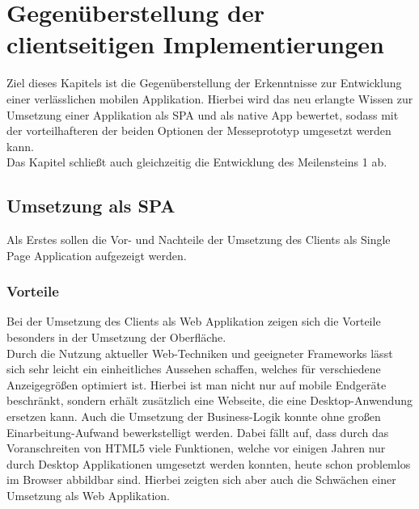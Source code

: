 \chapter{Gegenüberstellung der clientseitigen Implementierungen}
\label{cha:gegenueberstellung}
Ziel dieses Kapitels ist die Gegenüberstellung der Erkenntnisse zur Entwicklung einer verlässlichen mobilen Applikation. Hierbei wird das neu erlangte Wissen zur Umsetzung einer Applikation als \ac{SPA} und als native App bewertet, sodass mit der vorteilhafteren der beiden Optionen der Messeprototyp umgesetzt werden kann. \\
Das Kapitel schließt auch gleichzeitig die Entwicklung des Meilensteins 1 ab.

\section{Umsetzung als SPA}
\label{sec:gegenueberstellung-SPA}
Als Erstes sollen die Vor- und Nachteile der Umsetzung des Clients als Single Page Application aufgezeigt werden.

\subsection{Vorteile}
\label{sec:vorteile-SPA}
Bei der Umsetzung des Clients als Web Applikation zeigen sich die Vorteile besonders in der Umsetzung der Oberfläche. \\
Durch die Nutzung aktueller Web-Techniken und geeigneter Frameworks lässt sich sehr leicht ein einheitliches Aussehen schaffen, welches für verschiedene Anzeigegrößen optimiert ist. Hierbei ist man nicht nur auf mobile Endgeräte beschränkt, sondern erhält zusätzlich eine Webseite, die eine Desktop-Anwendung ersetzen kann. Auch die Umsetzung der Business-Logik konnte ohne großen Einarbeitung-Aufwand bewerkstelligt werden. Dabei fällt auf, dass durch das Voranschreiten von HTML5 viele Funktionen, welche vor einigen Jahren nur durch Desktop Applikationen umgesetzt werden konnten, heute schon problemlos im Browser abbildbar sind. Hierbei zeigten sich aber auch die Schwächen einer Umsetzung als Web Applikation. 

